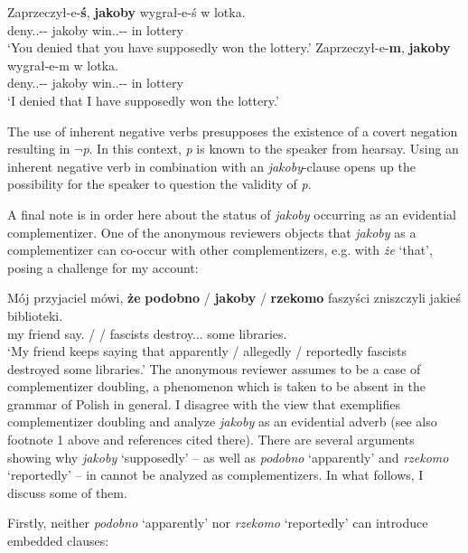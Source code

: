 \documentclass[output=paper
,modfonts
,nonflat]{langsci/langscibook}
\begin{document}
 \ea \ea \gll Zaprzeczył-e-\textbf{ś}, \textbf{jakoby} wygrał-e-ś w lotka.\\
  			deny.{\lptcp}.{\sg}-{\masc}-{\secondperson}{\sg} jakoby win.{\lptcp}.{\sg}-{\masc}-{\secondperson}{\sg} in lottery \\
	\glt	 `You denied that you have supposedly won the lottery.'
		\ex\gll	Zaprzeczył-e-\textbf{m}, \textbf{jakoby} wygrał-e-m w lotka.\\
  			deny.{\lptcp}.{\sg}-{\masc}-{\firstperson}{\sg} jakoby win.{\lptcp}.{\sg}-{\masc}-{\firstperson}{\sg} in lottery \\
	\glt		 `I denied that I have supposedly won the lottery.'
\z\z

The use of inherent negative verbs presupposes the existence of a covert negation resulting in $\lnot$\emph{p}. In this context, \emph{p} is known to the speaker from hearsay. Using an inherent negative verb in combination with an \emph{jakoby}-clause opens up the possibility for the speaker to question the validity of \emph{p}.

A final note is in order here about the status of \emph{jakoby} occurring as an evidential complementizer. One of the anonymous reviewers objects that \emph{jakoby} as a complementizer can co-occur with other complementizers, e.g. with \emph{że} `that', posing a challenge for my account:

\ea \gll Mój przyjaciel mówi, \textbf{że} \textbf{podobno} / \textbf{jakoby} / \textbf{rzekomo} faszyści zniszczyli jakieś biblioteki.  \label{challenge} \\
		my friend say.{\thirdperson}{\sg} {\comp} {\comp} / {\comp} / {\comp}  fascists destroy.{\lptcp}.{\vir}.{\pl} some libraries. \\
\glt	 `My friend keeps saying that apparently / allegedly / reportedly fascists destroyed some libraries.'
\z
The anonymous reviewer assumes  to be a case of complementizer doubling, a phenomenon which is taken to be absent in the grammar of Polish in general. I disagree with the view that  exemplifies complementizer doubling and analyze \emph{jakoby}  as an evidential adverb (see also footnote 1 above and references cited there). There are several arguments showing why \emph{jakoby}  `supposedly' – as well as \emph{podobno} `apparently' and \emph{rzekomo} `reportedly' – in  cannot be analyzed as  complementizers. In what follows, I discuss some of them. 

Firstly, neither \emph{podobno}  `apparently' nor \emph{rzekomo} `reportedly' can introduce embedded clauses:  
\end{document}
